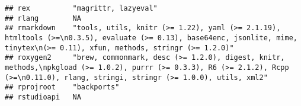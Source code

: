 \documentclass[]{book}
\begin{document}
\begin{verbatim}
## rex          "magrittr, lazyeval"                                                                                                                                                                                                                                                                                                                                                                                                                                                                                        
## rlang        NA                                                                                                                                                                                                                                                                                                                                                                                                                                                                                                          
## rmarkdown    "tools, utils, knitr (>= 1.22), yaml (>= 2.1.19), htmltools (>=\n0.3.5), evaluate (>= 0.13), base64enc, jsonlite, mime, tinytex\n(>= 0.11), xfun, methods, stringr (>= 1.2.0)"                                                                                                                                                                                                                                                                                                                              
## roxygen2     "brew, commonmark, desc (>= 1.2.0), digest, knitr, methods,\npkgload (>= 1.0.2), purrr (>= 0.3.3), R6 (>= 2.1.2), Rcpp (>=\n0.11.0), rlang, stringi, stringr (>= 1.0.0), utils, xml2"                                                                                                                                                                                                                                                                                                                       
## rprojroot    "backports"                                                                                                                                                                                                                                                                                                                                                                                                                                                                                                 
## rstudioapi   NA                                                                                                                                                                                                                                                                                                                                                                                                                                                                                                          

\end{verbatim}
\end{document}

